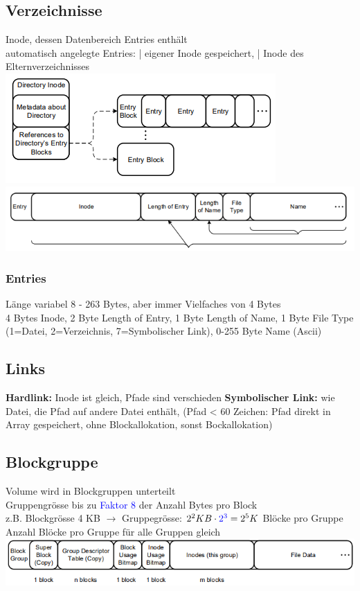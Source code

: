 \subsection{Verzeichnisse}
Inode, dessen Datenbereich Entries enthält\\
automatisch angelegte Entries:
 | eigener Inode gespeichert,  | Inode des Elternverzeichnisses\\
\includegraphics[scale = 0.3]{grafiken/verzeichnis.PNG}
\includegraphics[scale = 0.3]{grafiken/entry.PNG}

\subsubsection{Entries}
Länge variabel 8 - 263 Bytes, aber immer Vielfaches von 4 Bytes\\
4 Bytes Inode, 2 Byte Length of Entry, 1 Byte Length of Name, 1 Byte File Type (1=Datei, 2=Verzeichnis, 7=Symbolischer Link), 0-255 Byte Name (Ascii) 

\subsection{Links}
\textbf{Hardlink: }Inode ist gleich, Pfade sind verschieden
\textbf{Symbolischer Link: }wie Datei, die Pfad auf andere Datei enthält, (Pfad < 60 Zeichen: Pfad direkt in Array gespeichert, ohne Blockallokation, sonst Bockallokation)

\subsection{Blockgruppe}
Volume wird in Blockgruppen unterteilt\\
Gruppengrösse bis zu \textcolor{blue}{Faktor 8} der Anzahl Bytes pro Block\\
z.B. Blockgrösse 4 KB $\rightarrow$ Gruppegrösse: $2^2KB \cdot \textcolor{blue}{2^3} = 2^5K$ Blöcke pro Gruppe\\
Anzahl Blöcke pro Gruppe für alle Gruppen gleich\\
\includegraphics[scale = 0.4]{grafiken/blockgruppe.PNG}

